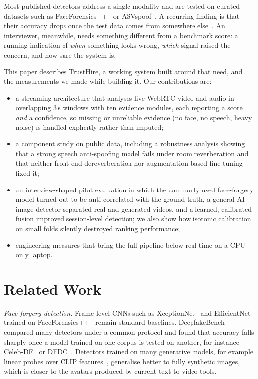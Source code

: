 \documentclass[conference]{IEEEtran}
\begin{document}
Most published detectors address a single modality and are tested on curated datasets such as
FaceForensics++~\cite{rossler2019ffpp} or ASVspoof~\cite{wang2020asvspoof}. A recurring finding is that their
accuracy drops once the test data comes from somewhere else~\cite{muller2022itw,yan2023deepfakebench}. An
interviewer, meanwhile, needs something different from a benchmark score: a running indication of
\emph{when} something looks wrong, \emph{which} signal raised the concern, and how sure the system is.

This paper describes TrustHire, a working system built around that need, and the measurements we made while
building it. Our contributions are:
\begin{itemize}
\item a streaming architecture that analyses live WebRTC video and audio in overlapping 3\,s windows with ten
evidence modules, each reporting a score \emph{and} a confidence, so missing or unreliable evidence (no face, no
speech, heavy noise) is handled explicitly rather than imputed;
\item a component study on public data, including a robustness analysis showing that a strong speech
anti-spoofing model fails under room reverberation and that neither front-end dereverberation nor augmentation-based
fine-tuning fixed it;
\item an interview-shaped pilot evaluation in which the commonly used face-forgery model turned out to be
anti-correlated with the ground truth, a general AI-image detector separated real and generated videos, and a
learned, calibrated fusion improved session-level detection; we also show how isotonic calibration on small
folds silently destroyed ranking performance;
\item engineering measures that bring the full pipeline below real time on a CPU-only laptop.
\end{itemize}

\section{Related Work}

\textit{Face forgery detection.} Frame-level CNNs such as XceptionNet~\cite{chollet2017xception} and
EfficientNet~\cite{tan2019efficientnet} trained on FaceForensics++~\cite{rossler2019ffpp} remain standard
baselines. DeepfakeBench~\cite{yan2023deepfakebench} compared many detectors under a common protocol and
found that accuracy falls sharply once a model trained on one corpus is tested on another, for instance
Celeb-DF~\cite{li2020celebdf} or DFDC~\cite{dolhansky2020dfdc}.
Detectors trained on many generative models, for example linear probes over CLIP features~\cite{ojha2023universal},
generalise better to fully synthetic images, which is closer to the avatars produced by current text-to-video
tools.
\end{document}
